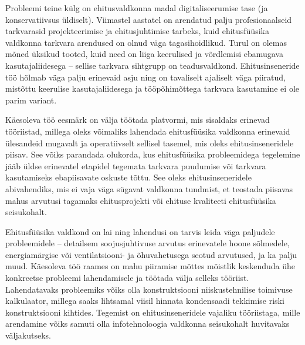 Probleemi teine külg on ehitusvaldkonna madal digitaliseerumise tase (ja konservatiivsus üldiselt). Viimastel aastatel on 
arendatud palju profesionaalseid tarkvarasid projekteerimise ja ehitusjuhtimise tarbeks, kuid ehitusfüüsika valdkonna 
tarkvara arendused on olnud väga tagasihoidlikud. Turul on olemas mõned üksikud tooted, kuid need on liiga keerulised ja võrdlemisi 
ebamugava kasutajaliidesega -- sellise tarkvara sihtgrupp on teadusvaldkond. Ehitusinseneride töö hõlmab väga palju erinevaid asju 
ning on tavaliselt ajaliselt väga piiratud, mistõttu keerulise kasutajaliidesega ja tööpõhimõttega tarkvara kasutamine ei ole parim variant. 

Käesoleva töö eesmärk on välja töötada platvormi, mis sisaldaks erinevad tööriistad, millega oleks võimaliks lahendada ehitusfüüsika valdkonna erinevaid ülesandeid mugavalt 
ja operatiivselt sellisel tasemel, mis oleks ehitusinseneridele piisav. See võiks parandada olukorda, kus ehitusfüüsika probleemidega tegelemine
jääb üldse erinevatel etapidel tegemata tarkvara puudumise või tarkvara kasutamiseks ebapiisavate oskuste tõttu. 
See oleks ehitusinseneridele abivahendiks, mis ei vaja väga sügavat valdkonna tundmist, et teostada piisavas mahus arvutusi 
tagamaks ehitusprojekti või ehituse kvaliteeti ehitusfüüsika seisukohalt. 

Ehitusfüüsika valdkond on lai ning lahendusi on tarvis leida väga paljudele probleemidele -- detailsem soojusjuhtivuse arvutus erinevatele hoone sõlmedele,
energiamärgise või ventilatsiooni- ja õhuvahetusega seotud arvutused, ja ka palju muud. Käesoleva töö raames on mahu piiramise mõttes mõistlik
keskenduda ühe konkreetse probleemi lahendamisele ja töötada välja selleks tööriist. Lahendatavaks probleemiks võiks olla konstruktsiooni
niiskustehnilise toimivuse kalkulaator, millega saaks lihtsamal viisil hinnata kondensaadi tekkimise riski konstruktsiooni kihtides.
Tegemist on ehitusinseneridele vajaliku tööriistaga, mille arendamine võiks samuti olla infotehnoloogia valdkonna seisukohalt
huvitavaks väljakutseks.
